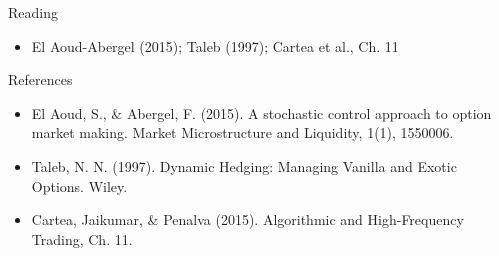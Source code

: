\documentclass[aspectratio=169,10pt]{beamer}
\begin{document}
\begin{frame}{Reading}
\begin{itemize}
  \item El Aoud-Abergel (2015); Taleb (1997); Cartea et al., Ch. 11
\end{itemize}
\end{frame}

\begin{frame}{References}
\scriptsize\begin{itemize}\setlength{\itemsep}{3pt}
  \item El Aoud, S., \& Abergel, F. (2015). A stochastic control approach to option market making. Market Microstructure and Liquidity, 1(1), 1550006.
  \item Taleb, N. N. (1997). Dynamic Hedging: Managing Vanilla and Exotic Options. Wiley.
  \item Cartea, Jaikumar, \& Penalva (2015). Algorithmic and High-Frequency Trading, Ch. 11.
\end{itemize}
\end{frame}
\end{document}
